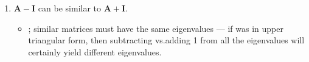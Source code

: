 \begin{itemize}
\begin{enumerate}
{\begin{enumerate}
        \item \(\bm{A} - \bm{I} \) can be similar to \(\bm{A}+\bm{I}\).
          \begin{itemize}\color{foreground}
            \item {}; similar matrices must have the same eigenvalues
              --- if  was in upper triangular form, then subtracting vs.\@ adding 1 from all the eigenvalues will
              certainly yield different eigenvalues.
          \end{itemize}

      \end{enumerate}
    }

  \end{enumerate}
\end{itemize}
